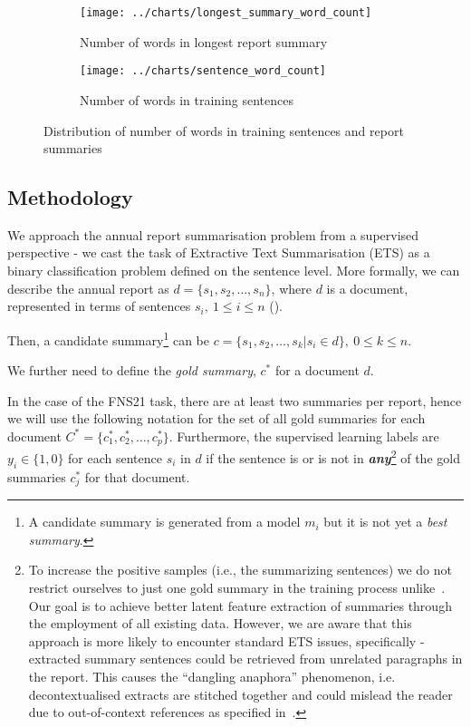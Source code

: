 \begin{figure}[ht]
    \begin{subfigure}{0.49\textwidth}
        \centering        \texttt{[image: ../charts/longest\_summary\_word\_count]}
        \caption{Number of words in longest report summary}
        \label{fig:longest_summary_word_count}
    \end{subfigure}%
    \hfill
    \begin{subfigure}{0.49\textwidth}
        \centering
        \texttt{[image: ../charts/sentence\_word\_count]}
        \caption{Number of words in training sentences}
        \label{fig:sentence_word_count}
    \end{subfigure}
    \caption{Distribution of number of words in training sentences and report summaries}
    \label{fig:word_count}
\end{figure}

\subsection{Methodology}\label{subsec:methodology}
We approach the annual report summarisation problem from a supervised perspective - we cast the task of Extractive Text Summarisation (ETS) as a binary classification problem defined on the sentence level.
More formally, we can describe the annual report as $d=\{s_{1}, s_{2}, \dots, s_{n}\}$, where $d$ is a document, represented in terms of sentences $s_{i}, \  1 \leq i \leq n$ (\cite{liu2019finetuningbert}).

Then, a candidate summary\footnote{
    A candidate summary is generated from a model $m_{i}$ but it is not yet a \emph{best summary}.
} can be $c=\{s_{1}, s_{2}, \dots, s_{k} | s_{i} \in d \}, \ 0 \leq k \leq n$.

We further need to define the \emph{gold summary}, $c^{*}$ for a document $d$.

In the case of the FNS21 task, there are at least two summaries per report, hence we will use the following notation for the set of all gold summaries for each document $C^{*} = \{c^{*}_{1}, c^{*}_{2}, \dots, c^{*}_{p}\}$.
Furthermore, the supervised learning labels are $y_{i} \in \{1,0\}$ for each sentence $s_{i}$ in $d$ if the sentence is or is not in \textbf{\emph{any}}\footnote{
    To increase the positive samples (i.e., the summarizing sentences) we do not restrict ourselves to just one gold summary in the training process unlike~\cite{orzhenovskii-2021-t5}.
    Our goal is to achieve better latent feature extraction of summaries through the employment of all existing data.
    However, we are aware that this approach is more likely to encounter standard ETS issues, specifically - extracted summary sentences could be retrieved from unrelated paragraphs in the report.
    This causes the \enquote{dangling anaphora} phenomenon, i.e. decontextualised extracts are stitched together and could mislead the reader due to out-of-context references as specified in~\cite{lin2009summarization}.
} of the gold summaries $c^{*}_{j}$ for that document.

